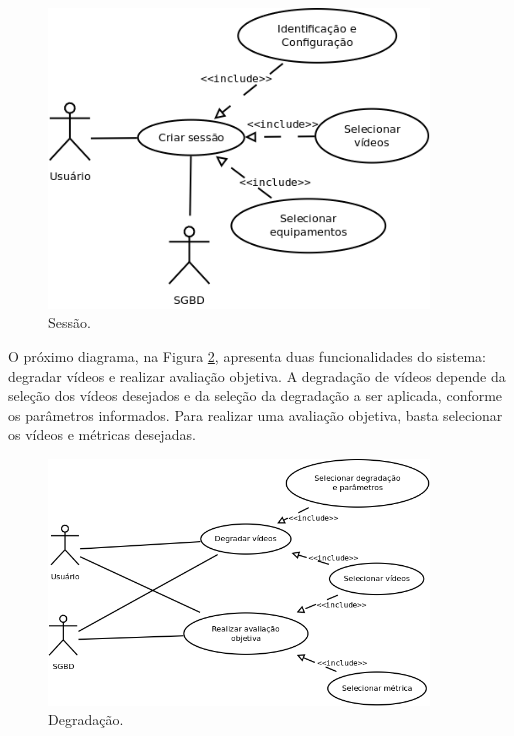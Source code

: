 \begin{figure}[!htb]
	\centering
	\includegraphics[width=0.9\textwidth]{./diagramas/sessao.png}
	\caption{Sessão.}
	\label{fig:ucdsessao}
\end{figure}

O próximo diagrama, na Figura \ref{fig:ucddegradacao}, apresenta duas funcionalidades do sistema: degradar vídeos e realizar avaliação objetiva. A degradação de vídeos depende da seleção dos vídeos desejados e da seleção da degradação a ser aplicada, conforme os parâmetros informados. Para realizar uma avaliação objetiva, basta selecionar os vídeos e métricas desejadas.

\begin{figure}[!htb]
	\centering
	\includegraphics[width=0.9\textwidth]{./diagramas/degradacao.png}
	\caption{Degradação.}
	\label{fig:ucddegradacao}
\end{figure}

